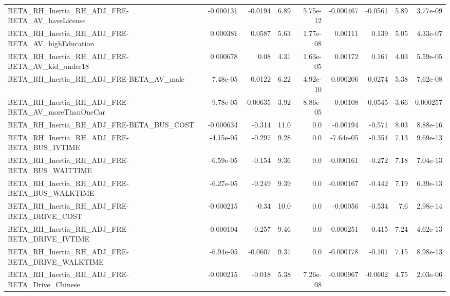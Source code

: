 \begin{tabular}{lrrrrrrrr}
BETA\_RH\_Inertia\_RH\_ADJ\_FRE-BETA\_AV\_haveLicense     &   -0.000131 &      -0.0194 &     6.89 & 5.75e-12 &  -0.000467 &     -0.0561 &         5.89 &      3.77e-09 \\
BETA\_RH\_Inertia\_RH\_ADJ\_FRE-BETA\_AV\_highEducation   &    0.000381 &       0.0587 &     5.63 & 1.77e-08 &    0.00111 &       0.139 &         5.05 &      4.33e-07 \\
BETA\_RH\_Inertia\_RH\_ADJ\_FRE-BETA\_AV\_kid\_under18     &    0.000678 &         0.08 &     4.31 & 1.63e-05 &    0.00172 &       0.161 &         4.03 &      5.59e-05 \\
BETA\_RH\_Inertia\_RH\_ADJ\_FRE-BETA\_AV\_male            &    7.48e-05 &       0.0122 &     6.22 & 4.92e-10 &   0.000206 &      0.0274 &         5.38 &      7.62e-08 \\
BETA\_RH\_Inertia\_RH\_ADJ\_FRE-BETA\_AV\_moreThanOneCar  &   -9.78e-05 &     -0.00635 &     3.92 & 8.86e-05 &   -0.00108 &     -0.0545 &         3.66 &      0.000257 \\
BETA\_RH\_Inertia\_RH\_ADJ\_FRE-BETA\_BUS\_COST           &   -0.000634 &       -0.314 &     11.0 &      0.0 &   -0.00194 &      -0.571 &         8.03 &      8.88e-16 \\
BETA\_RH\_Inertia\_RH\_ADJ\_FRE-BETA\_BUS\_IVTIME         &   -4.15e-05 &       -0.297 &     9.28 &      0.0 &  -7.64e-05 &      -0.354 &         7.13 &      9.69e-13 \\
BETA\_RH\_Inertia\_RH\_ADJ\_FRE-BETA\_BUS\_WAITTIME       &   -6.59e-05 &       -0.154 &     9.36 &      0.0 &  -0.000161 &      -0.272 &         7.18 &      7.04e-13 \\
BETA\_RH\_Inertia\_RH\_ADJ\_FRE-BETA\_BUS\_WALKTIME       &   -6.27e-05 &       -0.249 &     9.39 &      0.0 &  -0.000167 &      -0.442 &         7.19 &      6.39e-13 \\
BETA\_RH\_Inertia\_RH\_ADJ\_FRE-BETA\_DRIVE\_COST         &   -0.000215 &        -0.34 &     10.0 &      0.0 &   -0.00056 &      -0.534 &          7.6 &      2.98e-14 \\
BETA\_RH\_Inertia\_RH\_ADJ\_FRE-BETA\_DRIVE\_IVTIME       &   -0.000104 &       -0.257 &     9.46 &      0.0 &  -0.000251 &      -0.415 &         7.24 &      4.62e-13 \\
BETA\_RH\_Inertia\_RH\_ADJ\_FRE-BETA\_DRIVE\_WALKTIME     &   -6.94e-05 &      -0.0607 &     9.31 &      0.0 &  -0.000178 &      -0.101 &         7.15 &      8.98e-13 \\
BETA\_RH\_Inertia\_RH\_ADJ\_FRE-BETA\_Drive\_Chinese      &   -0.000215 &       -0.018 &     5.38 & 7.26e-08 &  -0.000967 &     -0.0602 &         4.75 &      2.03e-06 \\

\end{tabular}
